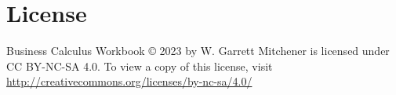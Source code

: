 \section*{License}

Business Calculus Workbook \copyright{} 2023 by W. Garrett Mitchener is licensed under CC BY-NC-SA 4.0. To view a copy of this license, visit \url{http://creativecommons.org/licenses/by-nc-sa/4.0/}

